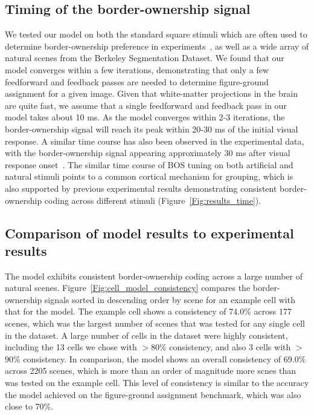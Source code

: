 \subsection{Timing of the border-ownership signal}
We tested our model on both the standard square stimuli which are often used to determine border-ownership preference in experiments~\citep{Zhou_etal00}, as well as a wide array of natural scenes from the Berkeley Segmentation Dataset. We found that our model converges within a few iterations, demonstrating that only a few feedforward and feedback passes are needed to determine figure-ground assignment for a given image.
Given that white-matter projections in the brain are quite fast, we assume that a single feedforward and feedback pass in our model takes about 10 ms. As the model converges within 2-3 iterations, the border-ownership signal will reach its peak within 20-30 ms of the initial visual response. A similar time course has also been observed in the experimental data, with the border-ownership signal appearing approximately 30 ms after visual response onset~\citep{Williford_vonderHeydt16}.
%
The similar time course of BOS tuning on both artificial and natural stimuli points to a common cortical mechanism for grouping, which is also supported by previous experimental results demonstrating consistent border-ownership coding across different stimuli (Figure~\ref{Fig:results_time}).

\subsection{Comparison of model results to experimental results}
The model exhibits consistent border-ownership coding across a large number of natural scenes. Figure~\ref{Fig:cell_model_consistency} compares the border-ownership signals sorted in descending order by scene for an example cell with that for the model. The example cell shows a consistency of 74.0\% across 177 scenes, which was the largest number of scenes that was tested for any single cell in the dataset. A large number of cells in the dataset were highly consistent, including the 13 cells we chose with $>$80\% consistency, and also 3 cells with $>$90\% consistency. In comparison, the model shows an overall consistency of 69.0\% across 2205 scenes, which is more than an order of magnitude more scnes than was tested on the example cell. This level of consistency is similar to the accuracy the model achieved on the figure-ground assignment benchmark, which was also close to 70\%.

